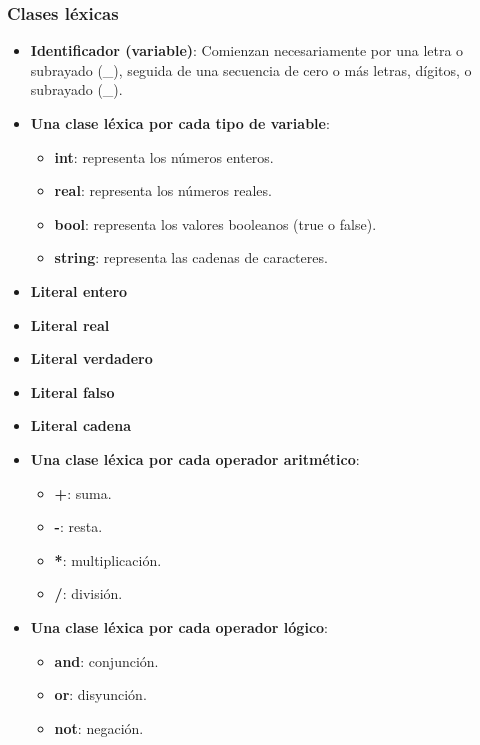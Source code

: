 \documentclass[11pt]{article}
\begin{document}
        \subsubsection*{Clases léxicas}
        \begin{itemize}
            \item \textbf{Identificador (variable)}: Comienzan necesariamente por una letra o subrayado (\_), seguida de una secuencia de cero o más letras, dígitos, o subrayado (\_).
            \item \textbf{Una clase léxica por cada tipo de variable}:
            \begin{itemize}
                \item \textbf{int}: representa los números enteros.
                \item \textbf{real}: representa los números reales.
                \item \textbf{bool}: representa los valores booleanos (true o false).
                \item \textbf{string}: representa las cadenas de caracteres.
            \end{itemize}
            \item \textbf{Literal entero}
            \item \textbf{Literal real}
            \item \textbf{Literal verdadero}
            \item \textbf{Literal falso}
            \item \textbf{Literal cadena}
            \item \textbf{Una clase léxica por cada operador aritmético}:
            \begin{itemize}
                \item \textbf{+}: suma.
                \item \textbf{-}: resta.
                \item \textbf{*}: multiplicación.
                \item \textbf{/}: división.
            \end{itemize}
            \item \textbf{Una clase léxica por cada operador lógico}:
            \begin{itemize}
                \item \textbf{and}: conjunción.
                \item \textbf{or}: disyunción.
                \item \textbf{not}: negación.

\end{itemize}
\end{itemize}
\end{document}
